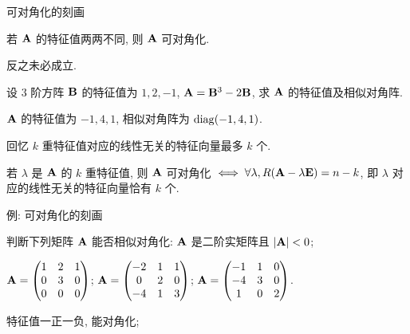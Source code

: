 \begin{frame}{可对角化的刻画}
	\onslide<+->
	\begin{corollary}
		若 ${\mathbf{A}}$ 的特征值两两不同, 则 ${\mathbf{A}}$ 可对角化.
	\end{corollary}
	\onslide<+->
	\alert{反之未必成立}.
	\onslide<+->
	\begin{example}
		设 $3$ 阶方阵 ${\mathbf{B}}$ 的特征值为 $1,2,-1$, ${\mathbf{A}}={\mathbf{B}}^3-2{\mathbf{B}}$, 求 ${\mathbf{A}}$ 的特征值及相似对角阵.
	\end{example}
	\onslide<+->
	\begin{solution}
		${\mathbf{A}}$ 的特征值为 $-1,4,1$, 相似对角阵为 ${\mathrm{diag}}(-1,4,1)$.
	\end{solution}
	\onslide<+->
	回忆 $k$ 重特征值对应的线性无关的特征向量最多 $k$ 个.
	\onslide<+->
	\begin{theorem}
		若 $\lambda$ 是 ${\mathbf{A}}$ 的 $k$ 重特征值, 则 ${\mathbf{A}}$ 可对角化 $\iff\forall\lambda, R({\mathbf{A}}-\lambda{\mathbf{E}})=n-k$, 即 $\lambda$ 对应的线性无关的特征向量恰有 $k$ 个.
	\end{theorem}
\end{frame}


\begin{frame}{例: 可对角化的刻画}
	\onslide<+->
	\begin{example}
		判断下列矩阵 ${\mathbf{A}}$ 能否相似对角化:
		 ${\mathbf{A}}$ 是二阶实矩阵且 $|{\mathbf{A}}|<0$;

		 ${\mathbf{A}}=\begin{pmatrix}
				1&2&1\\
				0&3&0\\
				0&0&0
			\end{pmatrix}$;
		 ${\mathbf{A}}=\begin{pmatrix}
				-2&1&1\\
				0&2&0\\
				-4&1&3
			\end{pmatrix}$;
		 ${\mathbf{A}}=\begin{pmatrix}
				-1&1&0\\
				-4&3&0\\
				1&0&2
			\end{pmatrix}$.
	\end{example}
	\onslide<+->
	\begin{solution}
		 特征值一正一负, 能对角化;
		\onslide<+->{%
			\enumnum2 特征值为 $1,3,0$, 能对角化;
		}
		
		
	\end{solution}
\end{frame}


